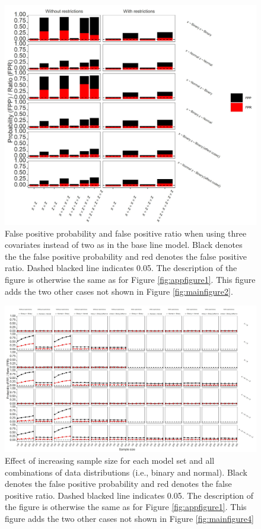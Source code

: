 \begin{figure}[hbt!]
\includegraphics[scale=0.95]{R/Analysis/Result/Figures/Figure1CSI.jpeg}
\centering
\caption{False positive probability and false positive ratio when using three covariates instead of two as in the base line model. Black denotes the the false positive probability and red denotes the false positive ratio. Dashed blacked line indicates 0.05. The description of the figure is otherwise the same as for Figure \ref{fig:appfigure1}. This figure adds the two other cases not shown in Figure \ref{fig:mainfigure2}.
}
\label{fig:appfigure5}
\end{figure}

\begin{landscape}
\begin{figure}[hbt!]
\includegraphics[scale=0.75]{R/Analysis/Result/Figures/Figure1DSI.jpeg}
\centering
\caption{Effect of increasing sample size for each model set and all combinations of data distributions (i.e., binary and normal). Black denotes the false positive probability and red denotes the false positive ratio. Dashed blacked line indicates 0.05. The description of the figure is otherwise the same as for Figure \ref{fig:appfigure1}. This figure adds the two other cases not shown in Figure \ref{fig:mainfigure4}}
\label{fig:appfigure6}
\end{figure}
\end{landscape}

